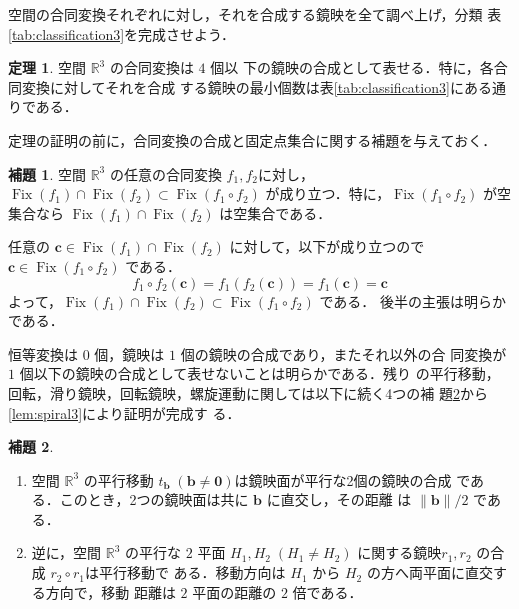 \documentclass[11pt, uplatex, dvipdfmx, titlepage]{jsarticle}
\makeatletter
\DeclareMathOperator{\Fix}{Fix}
\renewenvironment{proof}[1][\proofname]{\par
  \pushQED{\qed}%
  \normalfont \topsep6\p@\@plus6\p@\relax
  \trivlist
  \item[\hskip\labelsep
         \bfseries
    {#1}]\ignorespaces
}{%
  \popQED\endtrivlist\@endpefalse
}
\theoremstyle{definition}
\newtheorem{theorem}{定理}[section]
\newtheorem{lemma}{補題}[section]
\renewcommand{\proofname}{\textbf{証明}}
\makeatother
\begin{document}
空間の合同変換それぞれに対し，それを合成する鏡映を全て調べ上げ，分類
表\ref{tab:classification3}を完成させよう．

\begin{theorem}\label{thm:generate3}
  空間 $\mathbb{R}^3$ の合同変換は $4$ 個以
  下の鏡映の合成として表せる．特に，各合同変換に対してそれを合成
  する鏡映の最小個数は表\ref{tab:classification3}にある通りである．
\end{theorem}

定理の証明の前に，合同変換の合成と固定点集合に関する補題を与えておく．

\begin{lemma}\label{lem:inv-comp3}
  空間 $\mathbb{R}^3$ の任意の合同変換 $f_1,
  f_2$に対し，$ \Fix(f_1) \cap \Fix(f_2) \subset \Fix(f_1 \circ f_2)$
  が成り立つ．特に，$\Fix(f_1 \circ f_2)$ が空集合なら $\Fix(f_1) \cap
  \Fix(f_2)$ は空集合である．
\end{lemma}

\begin{proof}
  任意の $\bm{c} \in \Fix(f_1) \cap \Fix(f_2)$ に対して，以下が成り立つので $\bm{c} \in \Fix(f_1 \circ f_2)$ である．
  \[
    f_1 \circ f_2(\bm{c}) = f_1\left( f_2(\bm{c})\right) = f_1(\bm{c}) = \bm{c}
  \]
  よって，$\Fix(f_1) \cap \Fix(f_2) \subset \Fix(f_1 \circ f_2)$ である．
  後半の主張は明らかである．
\end{proof}


\begin{proof}[定理\ref{thm:generate3}の証明]
  恒等変換は $0$ 個，鏡映は $1$ 個の鏡映の合成であり，またそれ以外の合
  同変換が $1$ 個以下の鏡映の合成として表せないことは明らかである．残り
  の平行移動，回転，滑り鏡映，回転鏡映，螺旋運動に関しては以下に続く4つの補
  題\ref{lem:translation3}から\ref{lem:spiral3}により証明が完成す
  る．
\end{proof}


\begin{lemma}\label{lem:translation3}
  \begin{enumerate}[(1)]
  \item 空間 $\mathbb{R}^3$ の平行移動
    $t_{\bm{b}} \; (\bm{b} \neq \bm{0})$は鏡映面が平行な2個の鏡映の合成
    である．このとき，2つの鏡映面は共に $\bm{b}$ に直交し，その距離
    は $\|\bm{b}\|/2$ である．

\item 逆に，空間 $\mathbb{R}^3$ の平行な $2$ 平面 $H_1, H_2 \; (H_1
  \neq H_2)$ に関する鏡映$r_1, r_2$ の合成 $r_2 \circ r_1$は平行移動で
  ある．移動方向は $H_1$ から $H_2$ の方へ両平面に直交する方向で，移動
  距離は $2$ 平面の距離の $2$ 倍である．
  \end{enumerate}
\end{lemma}
\end{document}
